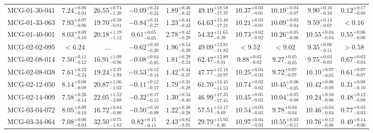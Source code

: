 \documentclass[onecolumn]{mn2e}
\begin{document}
\begin{landscape}
{\begin{center}
\begin{longtable}{lccccccccc}
MCG-01-30-041 & $7.24_{-0.04}^{+0.06}$ & $26.55_{-1.20}^{+0.74}$ & $-0.09_{-0.24}^{+0.24}$ & $1.89_{-0.42}^{+0.46}$ &$49.19_{-17.37}^{+18.58}$ & $10.37_{-0.01}^{+0.03}$ & $10.19_{-0.07}^{+0.04}$ & $9.90_{-0.10}^{+0.16}$ & $0.12_{-0.08}^{+0.17}$ \\
MCG-01-33-063 & $7.93_{-0.06}^{+0.07}$ & $19.70_{-0.81}^{+0.58}$ & $-0.84_{-0.27}^{+0.31}$ & $1.23_{-0.43}^{+0.44}$ &$64.63_{-17.21}^{+15.40}$ & $10.21_{-0.01}^{+0.03}$ & $10.09_{-0.04}^{+0.03}$ & $9.59_{-0.07}^{+0.14}$ & $<0.16$ \\
MCG-01-40-001 & $8.03_{-0.10}^{+0.09}$ & $20.18_{-1.12}^{+1.19}$ & $0.61_{-0.05}^{+0.05}$ & $2.78_{-0.29}^{+0.42}$ &$54.32_{-8.39}^{+11.65}$ & $10.73_{-0.02}^{+0.02}$ & $10.26_{-0.06}^{+0.05}$ & $10.55_{-0.04}^{+0.04}$ & $0.55_{-0.06}^{+0.06}$ \\
MCG-02-02-095 & $<6.24$ & ... & $-0.62_{-0.20}^{+0.10}$ & $1.96_{-0.39}^{+0.54}$ &$49.09_{-11.82}^{+12.81}$ & $<9.52$ & $<9.02$ & $9.35_{-0.11}^{+0.06}$ & $>0.58$ \\
MCG-02-08-014 & $7.50_{-0.12}^{+0.11}$ & $16.91_{-0.96}^{+1.09}$ & $-0.08_{-0.05}^{+0.04}$ & $1.81_{-0.24}^{+0.29}$ &$62.47_{-9.01}^{+12.89}$ & $9.88_{-0.02}^{+0.02}$ & $9.27_{-0.05}^{+0.05}$ & $9.75_{-0.03}^{+0.03}$ & $0.67_{-0.04}^{+0.03}$ \\
MCG-02-08-038 & $7.61_{-0.24}^{+0.22}$ & $19.24_{-1.93}^{+2.37}$ & $-0.53_{-0.14}^{+0.12}$ & $1.42_{-0.37}^{+0.44}$ &$47.77_{-10.97}^{+12.18}$ & $10.25_{-0.03}^{+0.04}$ & $9.72_{-0.07}^{+0.07}$ & $10.10_{-0.05}^{+0.07}$ & $0.61_{-0.07}^{+0.07}$ \\
MCG-02-12-050 & $8.14_{-0.08}^{+0.08}$ & $20.87_{-1.02}^{+1.06}$ & $-0.11_{-0.17}^{+0.12}$ & $1.79_{-0.28}^{+0.31}$ &$61.70_{-11.53}^{+14.45}$ & $10.74_{-0.02}^{+0.02}$ & $10.45_{-0.05}^{+0.06}$ & $10.42_{-0.08}^{+0.06}$ & $0.31_{-0.10}^{+0.08}$ \\
MCG-02-14-009 & $7.58_{-0.14}^{+0.26}$ & $22.05_{-2.68}^{+1.52}$ & $-0.32_{-0.15}^{+0.17}$ & $1.30_{-0.40}^{+0.54}$ &$46.99_{-17.45}^{+17.35}$ & $10.45_{-0.02}^{+0.05}$ & $10.04_{-0.08}^{+0.05}$ & $10.24_{-0.06}^{+0.10}$ & $0.48_{-0.08}^{+0.12}$ \\
MCG-03-04-072 & $8.05_{-0.10}^{+0.09}$ & $16.72_{-0.80}^{+0.84}$ & $-0.50_{-0.09}^{+0.10}$ & $1.22_{-0.28}^{+0.38}$ &$57.51_{-9.69}^{+13.17}$ & $10.54_{-0.03}^{+0.03}$ & $9.78_{-0.04}^{+0.04}$ & $10.46_{-0.04}^{+0.04}$ & $0.77_{-0.03}^{+0.03}$ \\
MCG-03-34-064 & $7.08_{-0.03}^{+0.06}$ & $32.50_{-1.82}^{+0.75}$ & $0.82_{-0.15}^{+0.15}$ & $2.43_{-0.91}^{+0.82}$ &$29.79_{-8.40}^{+15.93}$ & $10.97_{-0.03}^{+0.04}$ & $10.55_{-0.11}^{+0.03}$ & $10.76_{-0.06}^{+0.12}$ & $0.49_{-0.06}^{+0.14}$ \\

\end{longtable}
\end{center}}
\end{landscape}
\end{document}
